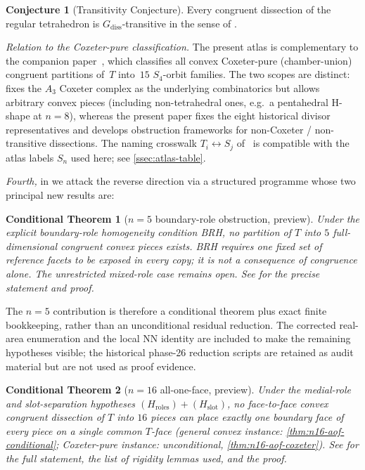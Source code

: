 \documentclass[11pt,a4paper]{article}
\theoremstyle{plain}
\newtheorem{conditionaltheorem}[conditionaltheorem]{Conditional Theorem}
\theoremstyle{definition}
\newtheorem{conjecture}[conjecture]{Conjecture}
\theoremstyle{remark}
\newcommand{\Hroles}{H_{\mathrm{roles}}}
\newcommand{\Hslot}{H_{\mathrm{slot}}}
\begin{document}
\begin{conjecture}[Transitivity Conjecture]\label{conj:transitivity}
Every congruent dissection of the regular tetrahedron is $G_{\mathrm{diss}}$-transitive
in the sense of .
\end{conjecture}

\smallskip

\noindent\emph{Relation to the Coxeter-pure classification.}  The present
atlas is complementary to the companion paper~\cite{CoxeterPure2026},
which classifies all convex Coxeter-pure (chamber-union) congruent
partitions of~$T$ into~$15$ $S_{4}$-orbit families.  The two scopes are
distinct: \cite{CoxeterPure2026} fixes the $A_{3}$ Coxeter complex as the
underlying combinatorics but allows arbitrary convex pieces (including
non-tetrahedral ones, e.g.\ a pentahedral H-shape at $n=8$), whereas the
present paper fixes the eight historical divisor representatives and
develops obstruction frameworks for non-Coxeter / non-transitive
dissections.  The naming crosswalk
$T_{i} \leftrightarrow S_{j}$ of~\cite{CoxeterPure2026}
is compatible with the atlas labels $S_{n}$ used here; see
\cref{ssec:atlas-table}.

\noindent\emph{Fourth,} in  we attack the reverse
direction via a structured programme whose two principal new results are:

\begin{conditionaltheorem}[$n=5$ boundary-role obstruction, preview]\label{thm:n5-intro}
Under the explicit boundary-role homogeneity condition BRH, no partition of
$T$ into $5$ full-dimensional congruent convex pieces exists.  BRH requires
one fixed set of reference facets to be exposed in every copy; it is not a
consequence of congruence alone.  The unrestricted mixed-role case remains
open.  See  for the precise statement and proof.
\end{conditionaltheorem}

The $n=5$ contribution is therefore a conditional theorem plus exact finite
bookkeeping, rather than an unconditional residual reduction.  The corrected
real-area enumeration and the local NN identity are included to make the
remaining hypotheses visible; the historical phase-26 reduction scripts are
retained as audit material but are not used as proof evidence.

\begin{conditionaltheorem}[$n=16$ all-one-face, preview]\label{thm:n16-intro}
Under the medial-role and slot-separation hypotheses $(\Hroles) + (\Hslot)$,
no face-to-face convex congruent dissection of $T$ into $16$ pieces can
place exactly one boundary face of every piece on a single common $T$-face
(general convex instance: \cref{thm:n16-aof-conditional}; Coxeter-pure
instance: unconditional, \cref{thm:n16-aof-coxeter}).
See  for the full statement, the list of rigidity
lemmas used, and the proof.
\end{conditionaltheorem}
\end{document}
